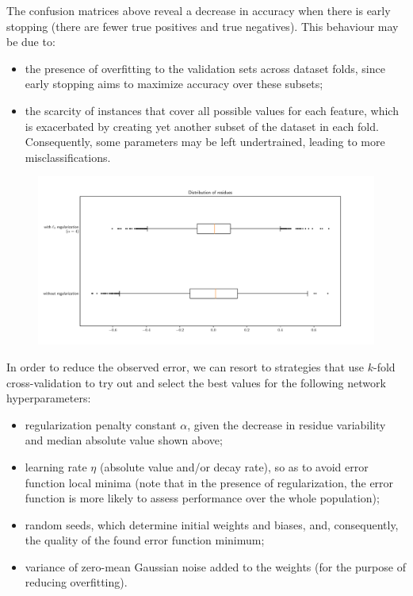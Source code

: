 \documentclass{exam}
\begin{document}
\begin{questions}
\begin{figure}[H]
\begin{minipage}[b]{0.49\textwidth}
            \end{minipage}
        \end{figure}
        \pagebreak
        The confusion matrices above reveal a decrease in accuracy when there is early stopping (there are fewer true positives and true negatives). This behaviour may be due to:
        \vspace{-0.5em}
        \begin{itemize}
            \item the presence of overfitting to the validation sets across dataset folds, since early stopping aims to maximize accuracy over these subsets;
            \item the scarcity of instances that cover all possible values for each feature, which is exacerbated by creating yet another subset of the dataset in each fold. Consequently, some parameters may be left undertrained, leading to more misclassifications.
        \end{itemize}
        \item \quad
        \vspace{-0.45cm}
        \begin{figure}[H]
            \centering
              \includegraphics[width=\textwidth]{residue_boxplot.pdf}
        \end{figure}
        In order to reduce the observed error, we can resort to strategies that use $k$-fold cross-validation to try out and select the best values for the following network hyperparameters:
        \begin{itemize}
            \item regularization penalty constant $\alpha$, given the decrease in residue variability and median absolute value shown above;
            \item learning rate $\eta$ (absolute value and/or decay rate), so as to avoid error function local minima (note that in the presence of regularization, the error function is more likely to assess performance over the whole population);
            \item random seeds, which determine initial weights and biases, and, consequently, the quality of the found error function minimum;
            \item variance of zero-mean Gaussian noise added to the weights (for the purpose of reducing overfitting).
        \end{itemize}      
    \end{questions}
\end{document}
